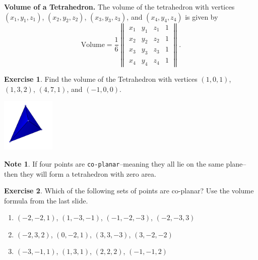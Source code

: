 \documentclass{beamer}
\newcommand{\fn}{\insertframenumber}
\theoremstyle{definition}
\newtheorem{exercise}{Exercise}
\newtheorem*{nb}{Note}
\renewcommand{\emph}[1]{{\color{blue}\texttt{#1}}}
\begin{document}
\begin{frame}{\fn}
	\begin{block}{\textbf{Volume of a Tetrahedron.}}
		The volume of the tetrahedron with vertices $(x_1,y_1,z_1)$, $(x_2,y_2,z_2)$, $(x_3,y_3,z_3)$, and $(x_4,y_4,z_4)$ is given by
			\[\text{Volume}=\frac{1}{6}\begin{Vmatrix}x_1&y_1&z_1&1\\x_2&y_2&z_2&1\\x_3&y_3&z_3&1\\x_4&y_4&z_4&1\end{Vmatrix}.\]
	\end{block}
	\begin{exercise}
		\begin{minipage}{.65\textwidth}Find the volume of the Tetrahedron with vertices $(1,0,1)$, $(1,3,2)$, $(4,7,1)$, and $(-1,0,0)$.\end{minipage}
		\begin{minipage}{.3\textwidth}
				\begin{center}
				\includegraphics[width=1in]{images/tetrahedron}
			\end{center}
		\end{minipage}
	\end{exercise}
\end{frame}

\begin{frame}{\fn}
	\begin{nb}
		If four points are \emph{co-planar}--meaning they all lie on the same plane--then they will form a tetrahedron with zero area.  
	\end{nb}
	\begin{exercise} Which of the following sets of points are co-planar?  Use the volume formula from the last slide.
		\begin{enumerate}[label=(\alph*)]
			\item $(-2, -2, 1)$, $(1, -3, -1)$, $(-1, -2, -3)$, $(-2, -3, 3)$
			\item $(-2, 3, 2)$, $(0, -2, 1)$, $(3, 3, -3)$, $(3, -2, -2)$
			\item $(-3, -1, 1)$, $(1, 3, 1)$, $(2, 2, 2)$, $(-1, -1, 2)$
		\end{enumerate}
	\end{exercise}
\end{frame}
\end{document}
